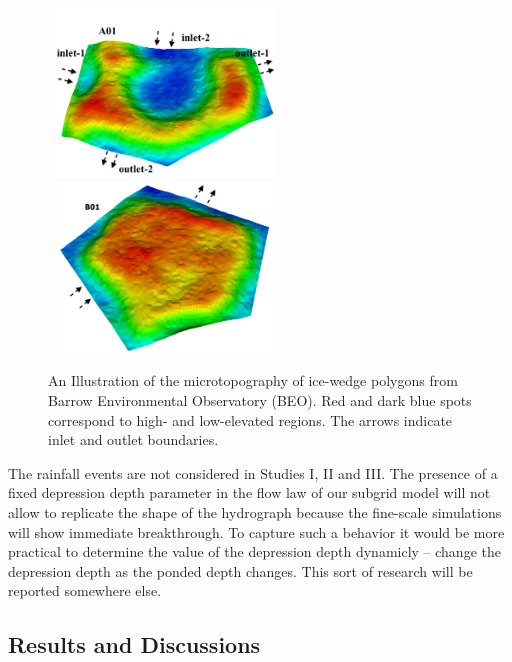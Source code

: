 \documentclass[review,11pt]{elsarticle}
\begin{document}
\begin{figure}[!h]
\includegraphics[width=6.2cm, height=4.5cm]{./figures/polygons-finescale/3DpolygonA01-3D.png}\\
\includegraphics[width=6.2cm, height=4.5cm]{./figures/polygons-finescale/3DpolygonB01-3B.png}
\caption{An Illustration of the microtopography of ice-wedge polygons from Barrow Environmental Observatory (BEO). Red and dark blue spots correspond to high- and low-elevated regions. The arrows indicate inlet and outlet boundaries.}
\label{IWP-finescale}
\end{figure}

The rainfall events are not considered in Studies I, II and III. The presence of a fixed depression depth parameter in the flow law of our subgrid model will not allow to replicate the shape of the hydrograph because the fine-scale simulations will show immediate breakthrough. To capture such a behavior it would be more practical to determine the value of the depression depth dynamicly -- change the depression depth as the ponded depth changes. This sort of research will be reported somewhere else.


\FloatBarrier
\subsection{Results and Discussions}
\end{document}
